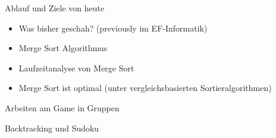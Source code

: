 


\begin{frame}[fragile]{Ablauf und Ziele von heute}
\begin{description}[<+->]
    \item[Lektion 1:]
        \begin{itemize}[<+->]
            \item Was bisher geschah? (previously im EF-Informatik)
            \item Merge Sort Algorithmus 
            \item Laufzeitanalyse von Merge Sort
            \item Merge Sort ist optimal (unter vergleichsbasierten Sortieralgorithmen)
        \end{itemize}
    \item[Lektion 2:] Arbeiten am Game in Gruppen
    \item[Lektion 3:] Backtracking und Sudoku
\end{description}
\end{frame}

